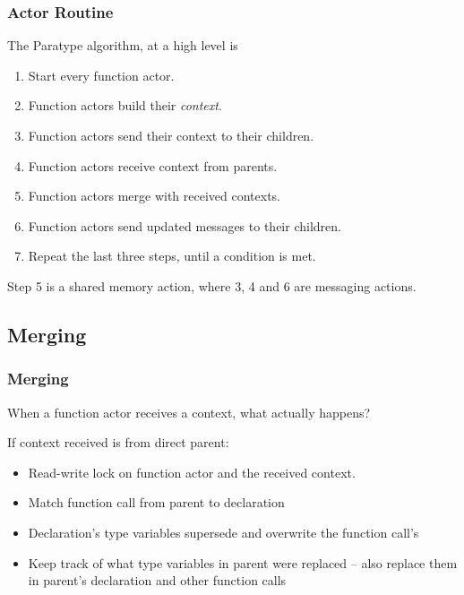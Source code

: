 \documentclass{beamer}
\begin{document}
\begin{frame}[fragile]
  \frametitle{Actor Routine}
  The Paratype algorithm, at a high level is
  \begin{multicols}{2}
    \begin{enumerate}
      \item Start every function actor.
      \item Function actors build their \emph{context}.
      \item Function actors send their context to their children.
      \item Function actors receive context from parents.
	  \item Function actors merge with received contexts.
      \item Function actors send updated messages to their children.
      \item Repeat the last three steps, until a condition is met.
    \end{enumerate}
  \end{multicols}

  Step 5 is a shared memory action, where 3, 4 and 6 are messaging
  actions.
\end{frame}

\subsection{Merging}


\begin{frame}
	\frametitle{Merging}

	When a function actor receives a context, what actually happens?

	If context received is from direct parent:
	\begin{itemize}
		\item Read-write lock on function actor and the received context.
		\item Match function call from parent to declaration
		\item Declaration's type variables supersede and overwrite the function
			call's
		\item Keep track of what type variables in parent were replaced -- also
			replace them in parent's declaration and other function calls
	\end{itemize}
\end{frame}
\end{document}
